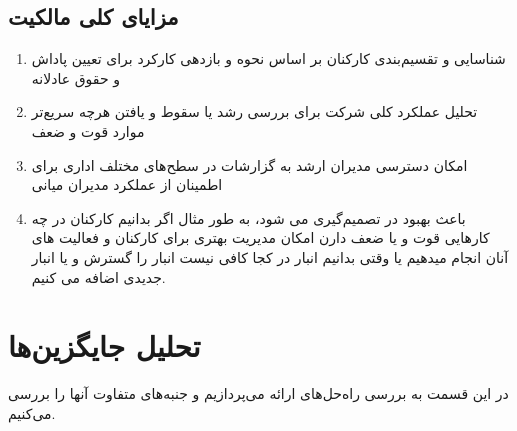 \documentclass[12pt, dvipsnames, svgnames, x11names,]{article}
\begin{document}
\subsection{مزایای کلی مالکیت }
\begin{enumerate}
    \item 
    شناسایی و تقسیم‌بندی کارکنان بر اساس نحوه و بازدهی کارکرد برای تعیین پاداش و حقوق عادلانه
    \item 
    تحلیل عملکرد کلی شرکت برای بررسی رشد یا سقوط و یافتن هرچه سریع‌تر موارد قوت و ضعف
    \item 
    امکان دسترسی مدیران ارشد به گزارشات در سطح‌های مختلف اداری برای اطمینان از عملکرد مدیران میانی 
    \item 
    باعث بهبود در تصمیم‌گیری می شود، به طور مثال اگر بدانیم کارکنان در چه کارهایی قوت و یا ضعف دارن امکان مدیریت بهتری برای کارکنان و فعالیت های آنان انجام میدهیم یا وقتی بدانیم انبار در کجا کافی نیست انبار را گسترش و یا انبار جدیدی اضافه می کنیم.
\end{enumerate}

\section{تحلیل جایگزین‌ها}
در این قسمت به بررسی راه‌حل‌های ارائه می‌پردازیم و جنبه‌های متفاوت‌ آنها را بررسی می‌کنیم.
\end{document}
